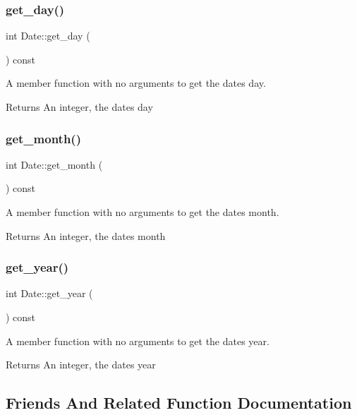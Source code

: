 \subsubsection{\texorpdfstring{get\+\_\+day()}{get\_day()}}
{\footnotesize\ttfamily int Date\+::get\+\_\+day (\begin{DoxyParamCaption}{ }\end{DoxyParamCaption}) const}

A member function with no arguments to get the date\textquotesingle{}s day. \begin{DoxyReturn}{Returns}
An integer, the date\textquotesingle{}s day 
\end{DoxyReturn}
\mbox{\label{class_date_a89ae60bad421600e3ee901eb0df44975}} 
\subsubsection{\texorpdfstring{get\+\_\+month()}{get\_month()}}
{\footnotesize\ttfamily int Date\+::get\+\_\+month (\begin{DoxyParamCaption}{ }\end{DoxyParamCaption}) const}

A member function with no arguments to get the date\textquotesingle{}s month. \begin{DoxyReturn}{Returns}
An integer, the date\textquotesingle{}s month 
\end{DoxyReturn}
\mbox{\label{class_date_a9e77e9f49890449fea9aeb8114da95ff}} 
\subsubsection{\texorpdfstring{get\+\_\+year()}{get\_year()}}
{\footnotesize\ttfamily int Date\+::get\+\_\+year (\begin{DoxyParamCaption}{ }\end{DoxyParamCaption}) const}

A member function with no arguments to get the date\textquotesingle{}s year. \begin{DoxyReturn}{Returns}
An integer, the date\textquotesingle{}s year 
\end{DoxyReturn}


\subsection{Friends And Related Function Documentation}
\mbox{\label{class_date_a5a3f411cbd59e9ecb90b2f8e6aaea551}} 
